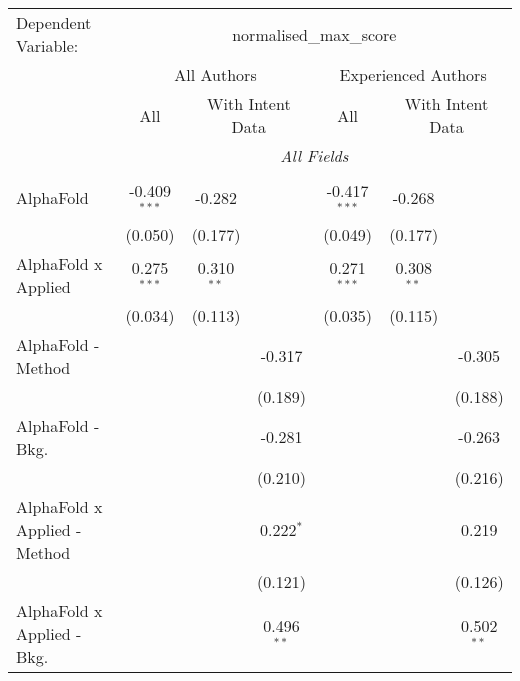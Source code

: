 \begingroup
\centering
\begin{tabular}{lcccccc}
   \tabularnewline \midrule \midrule
   Dependent Variable: & \multicolumn{6}{c}{normalised\_max\_score}\\
 & \multicolumn{3}{c}{All Authors} & \multicolumn{3}{c}{Experienced Authors} \\
\cmidrule(lr){2-4} \cmidrule(lr){5-7}
 & \multicolumn{1}{c}{All} & \multicolumn{2}{c}{With Intent Data} & \multicolumn{1}{c}{All} & \multicolumn{2}{c}{With Intent Data} \\
\cmidrule(lr){2-2} \cmidrule(lr){3-4} \cmidrule(lr){5-5} \cmidrule(lr){6-7}
 & \multicolumn{6}{c}{\textit{All Fields}} \\ \\
   AlphaFold                      & -0.409$^{***}$ & -0.282       &               & -0.417$^{***}$ & -0.268       &   \\   
                                  & (0.050)        & (0.177)      &               & (0.049)        & (0.177)      &   \\   
   AlphaFold x Applied            & 0.275$^{***}$  & 0.310$^{**}$ &               & 0.271$^{***}$  & 0.308$^{**}$ &   \\   
                                  & (0.034)        & (0.113)      &               & (0.035)        & (0.115)      &   \\   
   AlphaFold - Method             &                &              & -0.317        &                &              & -0.305\\   
                                  &                &              & (0.189)       &                &              & (0.188)\\   
   AlphaFold - Bkg.               &                &              & -0.281        &                &              & -0.263\\   
                                  &                &              & (0.210)       &                &              & (0.216)\\   
   AlphaFold x Applied - Method   &                &              & 0.222$^{*}$   &                &              & 0.219\\   
                                  &                &              & (0.121)       &                &              & (0.126)\\   
   AlphaFold x Applied - Bkg.     &                &              & 0.496$^{**}$  &                &              & 0.502$^{**}$\\   

\end{tabular}
